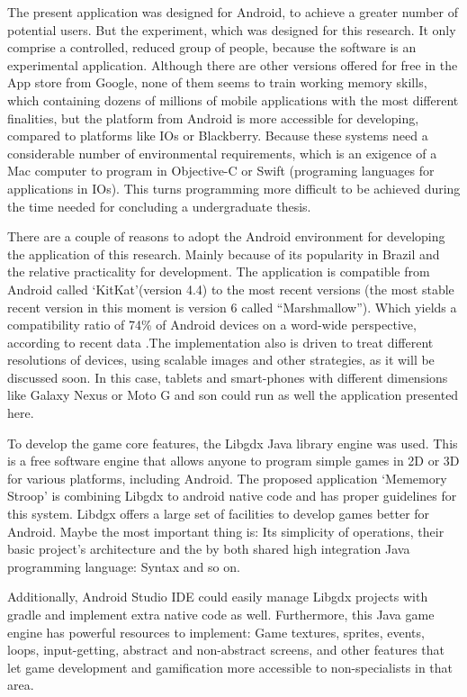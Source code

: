 		
The present application was designed for Android, to achieve a greater number of potential users. But the experiment, which was designed for this research. It only comprise a controlled, reduced group of people, because the software is an experimental application. Although there are other versions offered for free in the App store from Google, none of them seems to train working memory skills, which containing dozens of millions of mobile applications with the most different finalities, but the platform from Android is more accessible for developing, compared to platforms like IOs or Blackberry. Because these systems need a considerable number of environmental requirements, which is an exigence  of a Mac computer to program in Objective-C or Swift (programing languages for applications in IOs). This turns programming more difficult to be achieved during the time needed for concluding a undergraduate thesis. 

There are a couple of reasons to adopt the Android environment for developing the application of this research. Mainly because of its popularity in Brazil and the relative practicality for development. The application is compatible from Android called ‘KitKat’(version 4.4) to the most recent versions (the most stable recent version in this moment is version 6 called ``Marshmallow''). Which yields a compatibility ratio of 74\% of Android devices on a word-wide perspective, according to recent data \citep{android-official}.The implementation also is driven to treat different resolutions of devices, using scalable images and other strategies, as it will be discussed soon. In this case, tablets and smart-phones with different dimensions like Galaxy Nexus or Moto G and son could run as well the application presented here. 

To develop the game core features, the Libgdx Java library engine was used. This is a free software engine that allows anyone to program simple games  in 2D or 3D for various platforms, including Android. The proposed application ‘Mememory Stroop’ is combining Libgdx to android native code and  has proper guidelines for this system. Libdgx offers a large set of facilities to develop games better for Android. Maybe the most important thing is: Its simplicity of operations, their basic project's architecture and the by both shared high integration Java programming language: Syntax and so on. 

Additionally, Android Studio IDE could easily manage Libgdx projects with gradle and implement extra native code as well. Furthermore, this Java game engine has powerful resources to implement: Game textures, sprites, events, loops, input-getting, abstract and non-abstract screens, and other features that let game development and gamification more accessible to non-specialists in that area.

